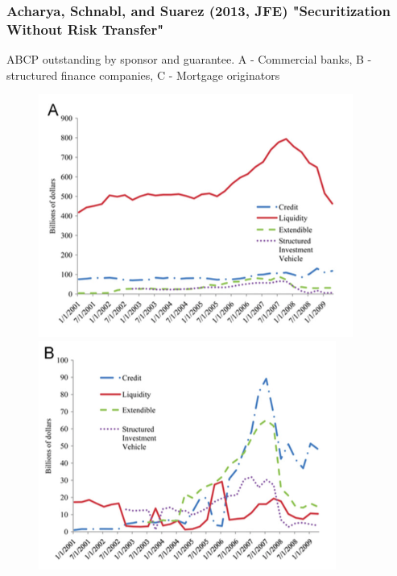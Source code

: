\documentclass[11pt]{beamer}
\begin{document}
\begin{frame}
	\frametitle{Acharya, Schnabl, and Suarez (2013, JFE) "Securitization Without Risk Transfer"}
    ABCP outstanding by sponsor and guarantee. A - Commercial banks, B - structured finance companies, C - Mortgage originators
    \begin{figure}
    	\begin{minipage}{0.33\textwidth}
	    	\begin{center}
	    		\includegraphics[width=\textwidth]{Figures/ASS2013_Figure3-A.png}
        	\end{center}
         \end{minipage}\begin{minipage}{0.33\textwidth}
	    	\begin{center}
	    		\includegraphics[width=\textwidth]{Figures/ASS2013_Figure3-B.png}

\end{center}
\end{minipage}
\end{figure}
\end{frame}
\end{document}
